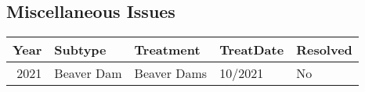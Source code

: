 \documentclass[
  landscape]{article}
\begin{document}
\hypertarget{miscellaneous-issues}{%
\subsection{Miscellaneous Issues}\label{miscellaneous-issues}}

\begin{longtable}[]{@{}rllll@{}}
\toprule()
Year & Subtype & Treatment & TreatDate & Resolved \\
\midrule()
\endhead
2021 & Beaver Dam & Beaver Dams & 10/2021 & No \\
\bottomrule()
\end{longtable}
\end{document}
